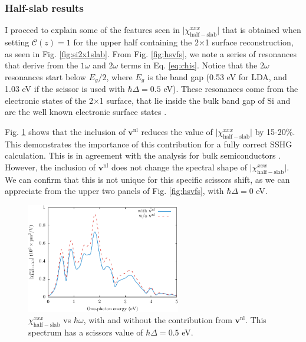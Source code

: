 


\subsubsection{Half-slab results}

I proceed to explain some of the features seen in
$\vert\chi^{xxx}_{\mathrm{half-slab}}\vert$ that is obtained when setting
$\mathbf{\mathcal{C}}(z) = 1$ for the upper half containing the 2$\times$1
surface reconstruction, as seen in Fig. \ref{fig:si2x1slab}. From Fig.
\ref{fig:hsvfs}, we note a series of resonances that derive from the $1\omega$
and $2\omega$ terms in Eq. \eqref{eq:chis}. Notice that the $2\omega$ resonances
start below $E_{g}/2$, where $E_{g}$ is the band gap (0.53 eV for LDA, and 1.03
eV if the scissor is used with $\hbar\Delta=0.5$ eV). These resonances come from
the electronic states of the 2$\times$1 surface, that lie inside the bulk band
gap of Si and are the well known electronic surface states \cite{rohlfingPRB95}.

Fig. \ref{fig:vnl} shows that the inclusion of $\mathbf{v}^\mathrm{nl}$ reduces
the value of $\vert\chi^{xxx}_{\mathrm{half-slab}}\vert$ by 15-20\%. This
demonstrates the importance of this contribution for a fully correct SSHG
calculation. This is in agreement with the analysis for bulk semiconductors
\cite{luppiPRB08}. However, the inclusion of $\mathbf{v}^\mathrm{nl}$ does not
change the spectral shape of $\vert\chi^{xxx}_{\mathrm{half-slab}}\vert$. We can
confirm that this is not unique for this specific scissors shift, as we can
appreciate from the upper two panels of Fig. \ref{fig:hsvfs}, with $\hbar\Delta
= 0$ eV.

\begin{figure}[b]
\centering 
\includegraphics[width=0.6\textwidth]{content/figures/fig-Si2x1-vnl}
\caption{$\chi^{xxx}_{\mathrm{half-slab}}$ vs $\hbar\omega$, with and without
the contribution from $\mathbf{v}^\mathrm{nl}$. This spectrum has a scissors
value of $\hbar\Delta=0.5$ eV.}
\label{fig:vnl}
\end{figure}

